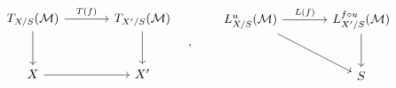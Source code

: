 \[
\begin{tikzcd}[column sep=large,row sep=large]
T_{X/S}(\mathcal M) \arrow[r,"T(f)"] \arrow[d] & T_{X'/S}(\mathcal M) \arrow[d]\\
X \arrow[r] & X'
\end{tikzcd}
\quad , \qquad
\begin{tikzcd}[column sep=large,row sep=large]
L^u_{X/S}(\mathcal M) \arrow[r,"L(f)"] \arrow[dr] & L^{f\circ u}_{X'/S}(\mathcal M) \arrow[d]\\
& S &
\end{tikzcd}
\]

